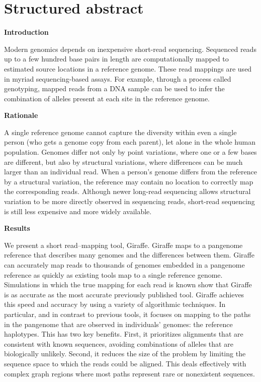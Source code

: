 \documentclass[11pt]{ucscthesis}
\begin{document}
\newpage

\section{Structured abstract}

\noindent
\textbf{Introduction}

Modern genomics depends on inexpensive short-read sequencing.
Sequenced reads up to a few hundred base pairs in length are computationally mapped to estimated source locations in a reference genome.
These read mappings are used in myriad sequencing-based assays.
For example, through a process called genotyping, mapped reads from a DNA sample can be used to infer the combination of alleles present at each site in the reference genome.

\noindent
\textbf{Rationale}

A single reference genome cannot capture the diversity within even a single person (who gets a genome copy from each parent), let alone in the whole human population.
Genomes differ not only by point variations, where one or a few bases are different, but also by structural variations, where differences can be much larger than an individual read.
When a person’s genome differs from the reference by a structural variation, the reference may contain no location to correctly map the corresponding reads.
Although newer long-read sequencing allows structural variation to be more directly observed in sequencing reads, short-read sequencing is still less expensive and more widely available.

\noindent
\textbf{Results}

We present a short read–mapping tool, Giraffe.
Giraffe maps to a pangenome reference that describes many genomes and the differences between them.
Giraffe can accurately map reads to thousands of genomes embedded in a pangenome reference as quickly as existing tools map to a single reference genome.
Simulations in which the true mapping for each read is known show that Giraffe is as accurate as the most accurate previously published tool.
Giraffe achieves this speed and accuracy by using a variety of algorithmic techniques.
In particular, and in contrast to previous tools, it focuses on mapping to the paths in the pangenome that are observed in individuals’ genomes: the reference haplotypes.
This has two key benefits.
First, it prioritizes alignments that are consistent with known sequences, avoiding combinations of alleles that are biologically unlikely.
Second, it reduces the size of the problem by limiting the sequence space to which the reads could be aligned.
This deals effectively with complex graph regions where most paths represent rare or nonexistent sequences.
\end{document}
